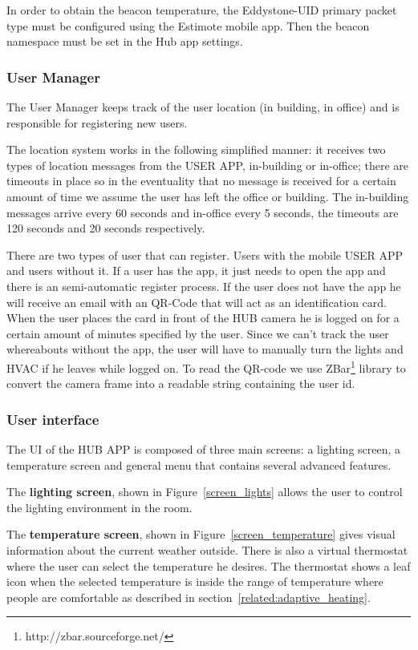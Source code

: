 In order to obtain the beacon temperature, the Eddystone-UID primary packet type must be configured using the Estimote mobile app. Then the beacon namespace must be set in the Hub app settings.


\subsubsection{User Manager}


The User Manager keeps track of the user location (in building, in office) and is responsible for registering new users.

The location system works in the following simplified manner: it receives two types of location messages from the USER APP, in-building or in-office; there are timeouts in place so in the eventuality that no message is received for a certain amount of time we assume the user has left the office or building. The in-building messages arrive every 60 seconds and in-office every 5 seconds, the timeouts are 120 seconds and 20 seconds respectively.


There are two types of user that can register. Users with the mobile USER APP and users without it. If a user has the app, it just needs to open the app and there is an semi-automatic register process. If the user does not have the app he will receive an email with an QR-Code that will act as an identification card. When the user places the card in front of the HUB camera he is logged on for a certain amount of minutes specified by the user. Since we can't track the user whereabouts without the app, the user will have to manually turn the lights and \ac{HVAC} if he leaves while logged on.
To read the QR-code we use ZBar\footnote{http://zbar.sourceforge.net/} library to convert the camera frame into a readable string containing the user id.



\subsubsection{User interface}


The \ac{UI} of the HUB APP is composed of three main screens: a lighting screen, a temperature screen and general menu that contains several advanced features.

The \textbf{lighting screen}, shown in Figure~\ref{screen_lights} allows the user to control the lighting environment in the room.

The \textbf{temperature screen}, shown in Figure~\ref{screen_temperature} gives visual information about the current weather outside. There is also a virtual thermostat where the user can select the temperature he desires. The thermostat shows a leaf icon when the selected temperature is inside the range of temperature where people are comfortable as described in section~\ref{related:adaptive_heating}. 


